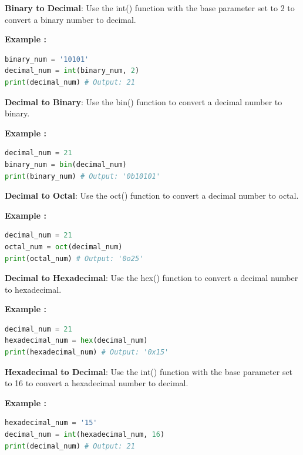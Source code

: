 \documentclass[12pt]{book}
\newtheorem{Example}{Example}[chapter]
\renewenvironment{Example}{\begin{trivlist}\item\relax
\textbf{Example \thesection: }}{\end{trivlist}}
\begin{document}
\begin{itemize}
\item \textbf{Binary to Decimal}: Use the int() function with the base parameter set to 2 to convert a binary number to decimal.
\begin{Example}
\begin{lstlisting}[language=Python]
binary_num = '10101'
decimal_num = int(binary_num, 2)
print(decimal_num) # Output: 21
\end{lstlisting}
\end{Example}

\item \textbf{Decimal to Binary}: Use the bin() function to convert a decimal number to binary.
\begin{Example}
\begin{lstlisting}[language=Python]
decimal_num = 21
binary_num = bin(decimal_num)
print(binary_num) # Output: '0b10101'
\end{lstlisting}
\end{Example}

\item \textbf{Decimal to Octal}: Use the oct() function to convert a decimal number to octal.
\begin{Example}
\begin{lstlisting}[language=Python]
decimal_num = 21
octal_num = oct(decimal_num)
print(octal_num) # Output: '0o25'
\end{lstlisting}
\end{Example}

\item \textbf{Decimal to Hexadecimal}: Use the hex() function to convert a decimal number to hexadecimal.
\begin{Example}
\begin{lstlisting}[language=Python]
decimal_num = 21
hexadecimal_num = hex(decimal_num)
print(hexadecimal_num) # Output: '0x15'
\end{lstlisting}
\end{Example}

\item \textbf{Hexadecimal to Decimal}: Use the int() function with the base parameter set to 16 to convert a hexadecimal number to decimal.
\begin{Example}
\begin{lstlisting}[language=Python]
hexadecimal_num = '15'
decimal_num = int(hexadecimal_num, 16)
print(decimal_num) # Output: 21
\end{lstlisting}
\end{Example}
\end{itemize}
\end{document}
